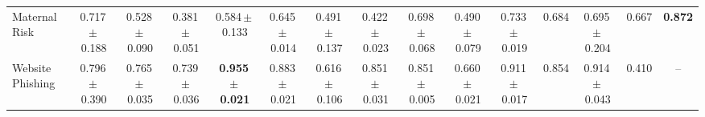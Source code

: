 \documentclass[8pt]{extarticle}
\begin{document}
\begin{longtable}{l*{14}{c}}
Maternal Risk & 0.717\,$\pm$\,0.188 & 0.528\,$\pm$\,0.090 & 0.381\,$\pm$\,0.051 & 0.584\,$\pm$\,0.133 & 0.645\,$\pm$\,0.014 & 0.491\,$\pm$\,0.137 & 0.422\,$\pm$\,0.023 & 0.698\,$\pm$\,0.068 & 0.490\,$\pm$\,0.079 & 0.733\,$\pm$\,0.019 & 0.684 & 0.695\,$\pm$\,0.204 & 0.667 & \textbf{0.872} \\
Website Phishing & 0.796\,$\pm$\,0.390 & 0.765\,$\pm$\,0.035 & 0.739\,$\pm$\,0.036 & \textbf{0.955\,$\pm$\,0.021} & 0.883\,$\pm$\,0.021 & 0.616\,$\pm$\,0.106 & 0.851\,$\pm$\,0.031 & 0.851\,$\pm$\,0.005 & 0.660\,$\pm$\,0.021 & 0.911\,$\pm$\,0.017 & 0.854 & 0.914\,$\pm$\,0.043 & 0.410 & -- \\
\end{longtable}
\end{document}
